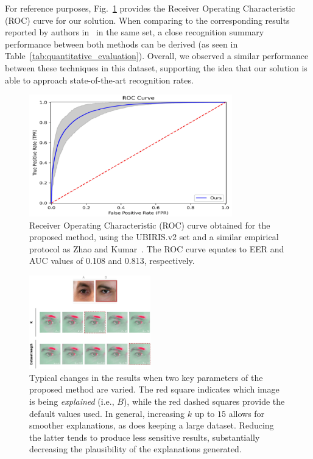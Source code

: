 \documentclass[final]{cvpr}
\begin{document}
For reference purposes, Fig.~\ref{fig:ROCs} provides the Receiver Operating Characteristic (ROC) curve for our solution. When comparing to the corresponding results reported by authors in~\cite{accurate_periocular_recognition} in the same set, a close recognition summary performance between both methods can be derived (as seen in Table~\ref{tab:quantitative_evaluation}). Overall, we observed a similar performance between these techniques in this dataset, supporting the idea that our solution is able to approach state-of-the-art recognition rates.

\begin{figure}[h]
  \begin{center}
  \includegraphics[width=250pt]{figures/ROCs.pdf}
  \caption{Receiver Operating Characteristic (ROC) curve obtained for the proposed method, using the UBIRIS.v2 set and a similar empirical protocol as Zhao and Kumar~\cite{accurate_periocular_recognition}. The ROC curve equates to EER and AUC values of 0.108 and 0.813, respectively.}
  \label{fig:ROCs}
  \end{center}
\end{figure}


\begin{figure}[h]
  \begin{center}
  \includegraphics[width=0.47\textwidth]{cvpr2021AuthorKit/latex/figures/figure_5_horizontal.pdf}
  \caption{Typical changes in the results when two key parameters of the proposed method are varied. The red square indicates which image is being \emph{explained} (i.e., $B$), while the red dashed squares provide the default values used. In general, increasing $k$ up to $15$ allows for smoother explanations, as does keeping a large dataset. Reducing the latter tends to produce less sensitive results, substantially decreasing the plausibility of the explanations generated.}
  \label{fig:ablation_study}
  \end{center}
\end{figure}
\end{document}
